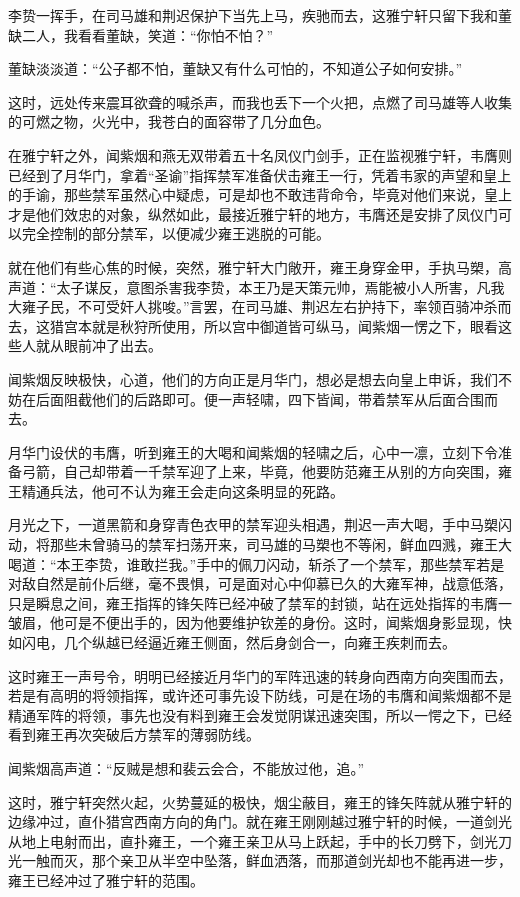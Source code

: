 李贽一挥手，在司马雄和荆迟保护下当先上马，疾驰而去，这雅宁轩只留下我和董缺二人，我看看董缺，笑道：“你怕不怕？”

董缺淡淡道：“公子都不怕，董缺又有什么可怕的，不知道公子如何安排。”

这时，远处传来震耳欲聋的喊杀声，而我也丢下一个火把，点燃了司马雄等人收集的可燃之物，火光中，我苍白的面容带了几分血色。

在雅宁轩之外，闻紫烟和燕无双带着五十名凤仪门剑手，正在监视雅宁轩，韦膺则已经到了月华门，拿着“圣谕”指挥禁军准备伏击雍王一行，凭着韦家的声望和皇上的手谕，那些禁军虽然心中疑虑，可是却也不敢违背命令，毕竟对他们来说，皇上才是他们效忠的对象，纵然如此，最接近雅宁轩的地方，韦膺还是安排了凤仪门可以完全控制的部分禁军，以便减少雍王逃脱的可能。

就在他们有些心焦的时候，突然，雅宁轩大门敞开，雍王身穿金甲，手执马槊，高声道：“太子谋反，意图杀害我李贽，本王乃是天策元帅，焉能被小人所害，凡我大雍子民，不可受奸人挑唆。”言罢，在司马雄、荆迟左右护持下，率领百骑冲杀而去，这猎宫本就是秋狩所使用，所以宫中御道皆可纵马，闻紫烟一愣之下，眼看这些人就从眼前冲了出去。

闻紫烟反映极快，心道，他们的方向正是月华门，想必是想去向皇上申诉，我们不妨在后面阻截他们的后路即可。便一声轻啸，四下皆闻，带着禁军从后面合围而去。

月华门设伏的韦膺，听到雍王的大喝和闻紫烟的轻啸之后，心中一凛，立刻下令准备弓箭，自己却带着一千禁军迎了上来，毕竟，他要防范雍王从别的方向突围，雍王精通兵法，他可不认为雍王会走向这条明显的死路。

月光之下，一道黑箭和身穿青色衣甲的禁军迎头相遇，荆迟一声大喝，手中马槊闪动，将那些未曾骑马的禁军扫荡开来，司马雄的马槊也不等闲，鲜血四溅，雍王大喝道：“本王李贽，谁敢拦我。”手中的佩刀闪动，斩杀了一个禁军，那些禁军若是对敌自然是前仆后继，毫不畏惧，可是面对心中仰慕已久的大雍军神，战意低落，只是瞬息之间，雍王指挥的锋矢阵已经冲破了禁军的封锁，站在远处指挥的韦膺一皱眉，他可是不便出手的，因为他要维护钦差的身份。这时，闻紫烟身影显现，快如闪电，几个纵越已经逼近雍王侧面，然后身剑合一，向雍王疾刺而去。

这时雍王一声号令，明明已经接近月华门的军阵迅速的转身向西南方向突围而去，若是有高明的将领指挥，或许还可事先设下防线，可是在场的韦膺和闻紫烟都不是精通军阵的将领，事先也没有料到雍王会发觉阴谋迅速突围，所以一愕之下，已经看到雍王再次突破后方禁军的薄弱防线。

闻紫烟高声道：“反贼是想和裴云会合，不能放过他，追。”

这时，雅宁轩突然火起，火势蔓延的极快，烟尘蔽目，雍王的锋矢阵就从雅宁轩的边缘冲过，直仆猎宫西南方向的角门。就在雍王刚刚越过雅宁轩的时候，一道剑光从地上电射而出，直扑雍王，一个雍王亲卫从马上跃起，手中的长刀劈下，剑光刀光一触而灭，那个亲卫从半空中坠落，鲜血洒落，而那道剑光却也不能再进一步，雍王已经冲过了雅宁轩的范围。

